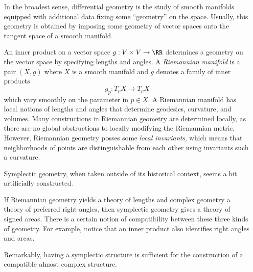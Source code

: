 
In the broadest sense, differential geometry is the study of smooth manifolds equipped with additional data fixing some ``geometry'' on the space. 
Usually, this geometry is obtained by imposing some geometry of vector spaces onto the tangent space of a smooth manifold.
\begin{example}
    An inner product on a vector space $g: V\times V\to \RR$ determines a geometry on the vector space by specifying lengths and angles.
    A \emph{Riemannian manifold} is a pair $(X, g)$ where $X$ is a smooth manifold and $g$ denotes a family of inner products 
    \[g_p: T_pX\to T_pX\]
    which vary smoothly on the parameter in $p\in X$. 
    A Riemannian manifold has local notions of lengths and angles that determine geodesics, curvature, and volumes.
    Many constructions in Riemannian geometry are determined locally, as there are no global obstructions to locally modifying the Riemannian metric.
    However, Riemannian geometry posses some \emph{local invariants,} which means that neighborhoods of points are distinguishable from each other using invariants such a curvature.
\end{example} 


Symplectic geometry, when taken outside of its historical context, seems a bit artificially constructed. 


If Riemannian geometry yields a theory of lengths and complex geometry a theory of preferred right-angles, then symplectic geometry gives a theory of signed areas. 
There is a certain notion of compatibility between these three kinds of geometry. For example, notice that an inner product also identifies right angles and areas. 

Remarkably, having a symplectic structure is sufficient for the construction of a compatible  almost complex structure. 
